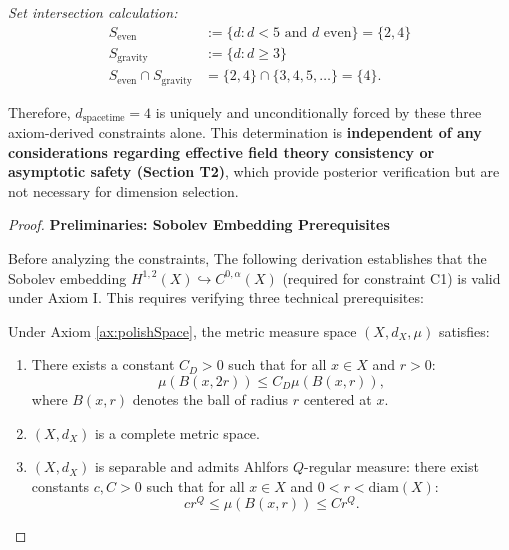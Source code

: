 \begin{lemma}
\textit{Set intersection calculation:}
\begin{align}
S_{\text{even}} &:= \{d : d < 5 \text{ and } d \text{ even}\} = \{2, 4\} \\
S_{\text{gravity}} &:= \{d : d \geq 3\} \\
S_{\text{even}} \cap S_{\text{gravity}} &= \{2, 4\} \cap \{3, 4, 5, \ldots\} = \{4\}.
\end{align}

Therefore, $d_{\mathrm{spacetime}} = 4$ is uniquely and unconditionally forced by these three axiom-derived constraints alone. This determination is \textbf{independent of any considerations regarding effective field theory consistency or asymptotic safety (Section T2)}, which provide posterior verification but are not necessary for dimension selection.

\begin{proof}

\textbf{Preliminaries: Sobolev Embedding Prerequisites}

Before analyzing the constraints, The following derivation establishes that the Sobolev embedding $H^{1,2}(X) \hookrightarrow C^{0,\alpha}(X)$ (required for constraint C1) is valid under Axiom I. This requires verifying three technical prerequisites:

\begin{lemma}
\label{lem:sobolevEmbeddingPrerequisites}

Under Axiom \ref{ax:polishSpace}, the metric measure space $(X, d_X, \mu)$ satisfies:

\begin{enumerate}
\item[\textbf{(P1) Doubling Measure:}] There exists a constant $C_D > 0$ such that for all $x \in X$ and $r > 0$:
\begin{equation}
\mu(B(x, 2r)) \leq C_D \mu(B(x, r)),
\end{equation}
where $B(x, r)$ denotes the ball of radius $r$ centered at $x$.

\item[\textbf{(P2) Completeness:}] $(X, d_X)$ is a complete metric space.

\item[\textbf{(P3) Separability and Ahlfors Regularity:}] $(X, d_X)$ is separable and admits Ahlfors $Q$-regular measure: there exist constants $c, C > 0$ such that for all $x \in X$ and $0 < r < \text{diam}(X)$:
\begin{equation}
c r^Q \leq \mu(B(x, r)) \leq C r^Q.
\end{equation}
\end{enumerate}


\end{lemma}
\end{proof}
\end{lemma}
